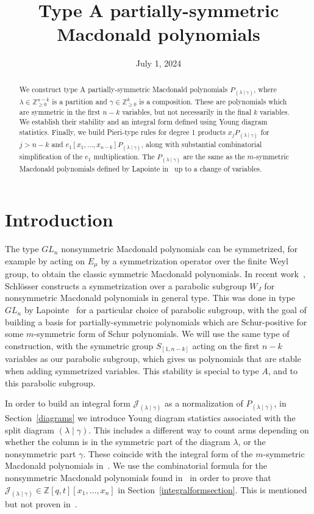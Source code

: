 \documentclass[ALCO]{cedram}
\title{Type A partially-symmetric Macdonald polynomials}
\author[\initial{B.} Goodberry]{\firstname{Ben}  \lastname{Goodberry}}
\date{July 1, 2024}
\newcommand{\PP}{P_{(\lambda \mid \gamma)}}
\newcommand{\JJ}{\mathcal{J}_{(\lambda \mid \gamma)}}
\newcommand{\nudom}{{( \lambda \mid \gamma )}}
\newcommand{\lambdagamma}{{\nudom}}
\begin{document}
\begin{abstract}
We construct type A partially-symmetric Macdonald polynomials $P_{(\lambda \mid \gamma)}$, where \mbox{$\lambda \in \mathbb{Z}_{\geq 0}^{n-k}$} is a partition and $\gamma \in \mathbb{Z}_{\geq 0}^k$ is a composition. These are polynomials which are symmetric in the first $n-k$ variables, but not necessarily in the final $k$ variables. We establish their stability and an integral form defined using Young diagram statistics. Finally, we build Pieri-type rules for degree 1 products $x_j P_{(\lambda \mid \gamma)}$ for $j > n-k$ and $e_1[x_1, \dotsc, x_{n-k}] P_{(\lambda \mid \gamma)}$, along with substantial combinatorial simplification of the $e_1$ multiplication. The $P_{(\lambda \mid \gamma)}$ are the same as the $m$-symmetric Macdonald polynomials defined by Lapointe in~\cite{Lapointe} up to a change of variables.
\end{abstract}

\maketitle

\section{Introduction}
The type $GL_n$ nonsymmetric Macdonald polynomials can be symmetrized, for example by acting on $E_\mu$ by a symmetrization operator over the finite Weyl group, to obtain the classic symmetric Macdonald polynomials. In recent work~\cite{Schlosser}, Schl\"{o}sser constructs a symmetrization over a parabolic subgroup $W_J$ for nonsymmetric Macdonald polynomials in general type. This was done in type $GL_n$ by Lapointe~\cite{Lapointe} for a particular choice of parabolic subgroup, with the goal of building a basis for partially-symmetric polynomials which are Schur-positive for some $m$-symmetric form of Schur polynomials. We will use the same type of construction, with the symmetric group $S_{[1,n-k]}$ acting on the first $n-k$ variables as our parabolic subgroup, which gives us polynomials that are stable when adding symmetrized variables. This stability is special to type $A$, and to this parabolic subgroup.

In order to build an integral form $\JJ$ as a normalization of $\PP$, in Section~\ref{diagrams} we introduce Young diagram statistics associated with the split diagram $\lambdagamma$. This includes a different way to count arms depending on whether the column is in the symmetric part of the diagram $\lambda$, or the nonsymmetric part $\gamma$. These coincide with the integral form of the $m$-symmetric Macdonald polynomials in~\cite{Lapointe}. We use the combinatorial formula for the nonsymmetric Macdonald polynomials found in~\cite{MR2405160} in order to prove that $\JJ \in \mathbb{Z}[q,t][x_1, \dotsc, x_n]$ in Section~\ref{integralformsection}. This is mentioned but not proven in~\cite{Lapointe}.
\end{document}
